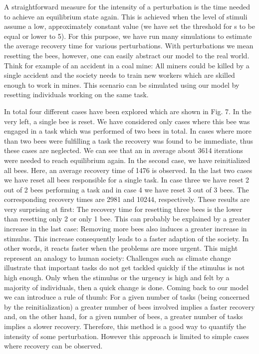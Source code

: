 A straightforward measure for the intensity of a perturbation is the time needed to achieve an equilibrium state again. This is achieved when the level of stimuli assume a low, approximately constant value (we have set the threshold for s to be equal or lower to 5). For this purpose, we have run many simulations to estimate the average recovery time for various perturbations. With perturbations we mean resetting the bees, however, one can easily abstract our model to the real world. Think for example of an accident in a coal mine: All miners could be killed by a single accident and the society needs to train new workers which are skilled enough to work in mines. This scenario can be simulated using our model by resetting individuals working on the same task. 

In total four different cases have been explored which are shown in Fig. 7. In the very left, a single bee is reset. We have considered only cases where this bee was engaged in a task which was performed of two bees in total. In cases where more than two bees were fulfilling a task the recovery was found to be immediate, thus these cases are neglected. We can see that an in average about 3614 iterations were needed to reach equilibrium again. In the second case, we have reinitialized all bees. Here, an average recovery time of 1476 is observed. In the last two cases we have reset all bees responsible for a single task. In case three we have reset 2 out of 2 bees performing a task and in case 4 we have reset 3 out of 3 bees. The corresponding recovery times are 2981 and 10244, respectively. These results are very surprising at first: The recovery time for resetting three bees is the lower than resetting only 2 or only 1 bee. This can probably be explained by a greater increase in the last case: Removing more bees also induces a greater increase in stimulus. This increase consequently leads to a faster adaption of the society. In other words, it reacts faster when the problems are more urgent. This might represent an analogy to human society: Challenges such as climate change illustrate that important tasks do not get tackled quickly if the stimulus is not high enough. Only when the stimulus or the urgency is high and felt by a majority of individuals, then a quick change is done. Coming back to our model we can introduce a rule of thumb: For a given number of tasks (being concerned by the reinitialization) a greater number of bees involved implies a faster recovery and, on the other hand, for a given number of bees, a greater number of tasks implies a slower recovery.
Therefore, this method is a good way to quantify the intensity of some perturbation. However this approach is limited to simple cases where recovery can be observed.

